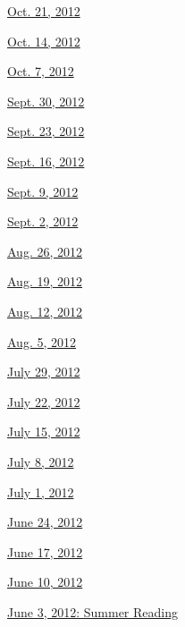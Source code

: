 \href{http://www.nytimes.com/indexes/2012/10/21/books/review/index.html}{Oct.
21, 2012}

\href{http://www.nytimes.com/indexes/2012/10/14/books/review/index.html}{Oct.
14, 2012}

\href{http://www.nytimes.com/indexes/2012/10/07/books/review/index.html}{Oct.
7, 2012}

\href{http://www.nytimes.com/indexes/2012/09/30/books/review/index.html}{Sept.
30, 2012}

\href{http://www.nytimes.com/indexes/2012/09/23/books/review/index.html}{Sept.
23, 2012}

\href{http://www.nytimes.com/indexes/2012/09/16/books/review/index.html}{Sept.
16, 2012}

\href{http://www.nytimes.com/indexes/2012/09/09/books/review/index.html}{Sept.
9, 2012}

\href{http://www.nytimes.com/indexes/2012/09/02/books/review/index.html}{Sept.
2, 2012}

\href{http://www.nytimes.com/indexes/2012/08/26/books/review/index.html}{Aug.
26, 2012}

\href{http://www.nytimes.com/indexes/2012/08/19/books/review/index.html}{Aug.
19, 2012}

\href{http://www.nytimes.com/indexes/2012/08/12/books/review/index.html}{Aug.
12, 2012}

\href{http://www.nytimes.com/indexes/2012/08/05/books/review/index.html}{Aug.
5, 2012}

\href{http://www.nytimes.com/indexes/2012/07/29/books/review/index.html}{July
29, 2012}

\href{http://www.nytimes.com/indexes/2012/07/22/books/review/index.html}{July
22, 2012}

\href{http://www.nytimes.com/indexes/2012/07/15/books/review/index.html}{July
15, 2012}

\href{http://www.nytimes.com/indexes/2012/07/08/books/review/index.html}{July
8, 2012}

\href{http://www.nytimes.com/indexes/2012/07/01/books/review/index.html}{July
1, 2012}

\href{http://www.nytimes.com/indexes/2012/06/24/books/review/index.html}{June
24, 2012}

\href{http://www.nytimes.com/indexes/2012/06/17/books/review/index.html}{June
17, 2012}

\href{http://www.nytimes.com/indexes/2012/06/10/books/review/index.html}{June
10, 2012}

\href{http://www.nytimes.com/indexes/2012/06/03/books/review/index.html}{June
3, 2012: Summer Reading}

